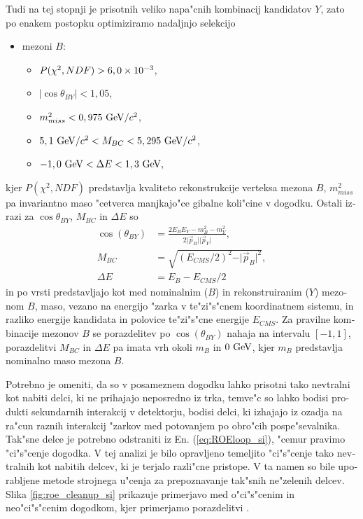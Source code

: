 \begin{otherlanguage}{slovene}
Tudi na tej stopnji je prisotnih veliko napa"cnih kombinacij kandidatov $Y$, zato po enakem postopku optimiziramo nadaljnjo selekcijo

\begin{itemize}
\item mezoni $B$: 
\begin{itemize}
	\item $P(\chi^2, NDF) > 6,0\times 10^{-3}$, 
	\item $\vert \cos \theta_{BY} \vert < 1,05$,  
	\item $m_{miss}^2 < 0,975\mathrm{~GeV}/c^2$, 
	\item $5,1\mathrm{~GeV}/c^2 < M_{BC} < 5,295\mathrm{~GeV}/c^2$, 
	\item $-1,0\mathrm{~GeV} < \Delta E < 1,3\mathrm{~GeV},$
\end{itemize} 
\end{itemize}
kjer $P(\chi^2, NDF)$ predstavlja kvaliteto rekonstrukcije verteksa mezona $B$, $m_{miss}^2$ pa invariantno maso "cetverca manjkajo"ce gibalne koli"cine v dogodku. Ostali izrazi za $\cos \theta_{BY}$, $M_{BC}$ in $\Delta E$ so
\begin{align}
\cos \left(\theta_{BY}\right) &= \frac{2E_BE_Y - m_B^2 - m_Y^2}{2\vert \vec{p}_B \vert \vert \vec{p}_Y\vert},\\
M_{BC} &= \sqrt{\left(E_{CMS}/2\right)^2 - \vert \vec{p}_B \vert^2},\\
\Delta E &= E_B - E_{CMS}/2
\end{align}
in po vrsti predstavljajo kot med nominalnim ($B$) in rekonstruiranim ($Y$) mezonom $B$, maso, vezano na energijo "zarka v te"zi"s"cnem koordinatnem sistemu, in razliko energije kandidata in polovice te"zi"s"cne energije $E_{CMS}$. Za pravilne kombinacije mezonov $B$ se porazdelitev po $\cos \left(\theta_{BY}\right)$ nahaja na intervalu $[-1, 1]$, porazdelitvi $M_{BC}$ in $\Delta E$ pa imata vrh okoli $m_B$ in $0\mathrm{~GeV}$, kjer $m_B$ predstavlja nominalno maso mezona $B$.

Potrebno je omeniti, da so v posameznem dogodku lahko prisotni tako nevtralni kot nabiti delci, ki ne prihajajo neposredno iz trka, temve"c so lahko bodisi produkti sekundarnih interakcij v detektorju, bodisi delci, ki izhajajo iz ozadja na ra"cun raznih interakcij "zarkov med potovanjem po obro"cih pospe"sevalnika. Tak"sne delce je potrebno odstraniti iz En. (\ref{eq:ROEloop_si}), "cemur pravimo "ci"s"cenje dogodka. V tej analizi je bilo opravljeno temeljito "ci"s"cenje tako nevtralnih kot nabitih delcev, ki je terjalo razli"cne pristope. V ta namen so bile uporabljene metode strojnega u"cenja za prepoznavanje tak"snih ne"zelenih delcev. Slika \ref{fig:roe_cleanup_si} prikazuje primerjavo med o"ci"s"cenim in neo"ci"s"cenim dogodkom, kjer primerjamo porazdelitvi \varss.


\end{otherlanguage}
